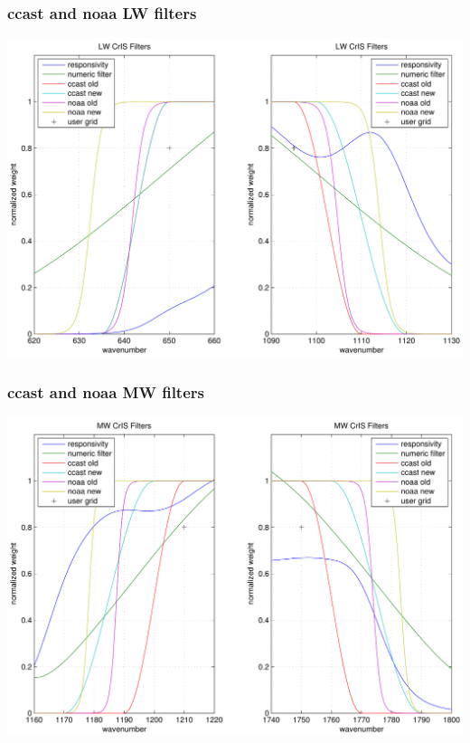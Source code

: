 \documentclass[11pt]{beamer}
\begin{document}
\begin{frame}
\frametitle{ccast and noaa LW filters}
\begin{center}
  \includegraphics[scale=0.5]{figures/show_filts_LW.pdf}
\end{center}
\end{frame}
\begin{frame}
\frametitle{ccast and noaa MW filters}
\begin{center}
  \includegraphics[scale=0.5]{figures/show_filts_MW.pdf}
\end{center}
\end{frame}
\end{document}
